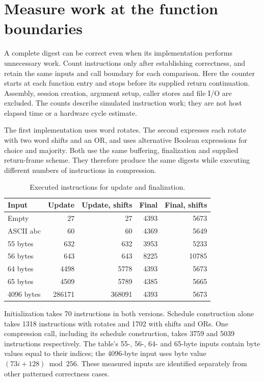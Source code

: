 \section{Measure work at the function boundaries}
A complete digest can be correct even when its implementation performs unnecessary
work. Count instructions only after establishing correctness, and retain the same
inputs and call boundary for each comparison. Here the counter starts at each function
entry and stops before its supplied return continuation. Assembly, session creation,
argument setup, caller stores and file I/O are excluded. The counts describe simulated
instruction work; they are not host elapsed time or a hardware cycle estimate.

The first implementation uses word rotates. The second expresses each rotate with two
word shifts and an OR, and uses alternative Boolean expressions for choice and majority.
Both use the same buffering, finalization and supplied return-frame scheme. They therefore produce the same
digests while executing different numbers of instructions in compression.

\begin{table}[htbp]
  \centering\caption{Executed instructions for update and finalization.}
  \begin{tabular}{lrrrr}
    \toprule
    Input      & Update & Update, shifts & Final & Final, shifts \\
    \midrule
    Empty      & 27     & 27             & 4393  & 5673          \\
    ASCII abc  & 60     & 60             & 4369  & 5649          \\
    55 bytes   & 632    & 632            & 3953  & 5233          \\
    56 bytes   & 643    & 643            & 8225  & 10785         \\
    64 bytes   & 4498   & 5778           & 4393  & 5673          \\
    65 bytes   & 4509   & 5789           & 4385  & 5665          \\
    4096 bytes & 286171 & 368091         & 4393  & 5673          \\
    \bottomrule
  \end{tabular}
\end{table}

Initialization takes 70 instructions in both versions. Schedule construction alone
takes 1318 instructions with rotates and 1702 with shifts and ORs. One compression call,
including its schedule construction, takes 3759 and 5039 instructions respectively.
The table's 55-, 56-, 64- and 65-byte inputs contain byte values equal to their indices;
the 4096-byte input uses byte value \((73i+128)\bmod256\). These measured inputs are
identified separately from other patterned correctness cases.

